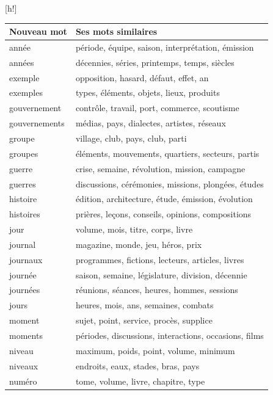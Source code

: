 \documentclass{style/these}
\makeatletter
\renewcommand\familydefault{ptm}
\newenvironment{aTable}%
  {%
   \renewcommand{\familydefault}{lmtt}\selectfont
  \@float{table}}
  {\end@float}
\makeatother
\begin{document}
\begin{part}
\begin{aTable}[h!]
\centering
\begin{tabular}{|l|l|}
\hline
\textbf{Nouveau mot} & \textbf{Ses mots similaires}			\\ \hline
année   	& période, équipe, saison, interprétation, émission	\\ \hline
années  	& décennies, séries, printemps, temps, siècles		\\ \hline
exemple 	& opposition, hasard, défaut, effet, an			\\ \hline
exemples 	& types, éléments, objets, lieux, produits		\\ \hline
gouvernement 	& contrôle, travail, port, commerce, scoutisme		\\ \hline
gouvernements 	& médias, pays, dialectes, artistes, réseaux		\\ \hline
groupe 		& village, club, pays, club, parti			\\ \hline
groupes		& éléments, mouvements, quartiers, secteurs, partis	\\ \hline
guerre 		& crise, semaine, révolution, mission, campagne		\\ \hline
guerres 	& discussions, cérémonies, missions, plongées, études	\\ \hline	
histoire 	& édition, architecture, étude, émission, évolution	\\ \hline
histoires 	& prières, leçons, conseils, opinions, compositions	\\ \hline
jour 		& volume,  mois,  titre,  corps,  livre			\\ \hline
journal 	& magazine, monde, jeu, héros, prix 			\\ \hline
journaux 	& programmes, fictions, lecteurs, articles, livres	\\ \hline
journée 	& saison, semaine, législature, division, décennie	\\ \hline
journées 	& réunions, séances, heures, hommes, sessions		\\ \hline
jours 		& heures, mois, ans, semaines, combats			\\ \hline
moment 		& sujet, point, service, procès, supplice		\\ \hline
moments		& périodes, discussions, interactions, occasions, films	\\ \hline
niveau 		& maximum, poids, point, volume, minimum		\\ \hline
niveaux 	& endroits, eaux, stades, bras, pays 			\\ \hline
numéro 		& tome, volume, livre, chapitre, type 			\\ \hline

\end{tabular}
\end{aTable}
\end{part}
\end{document}
